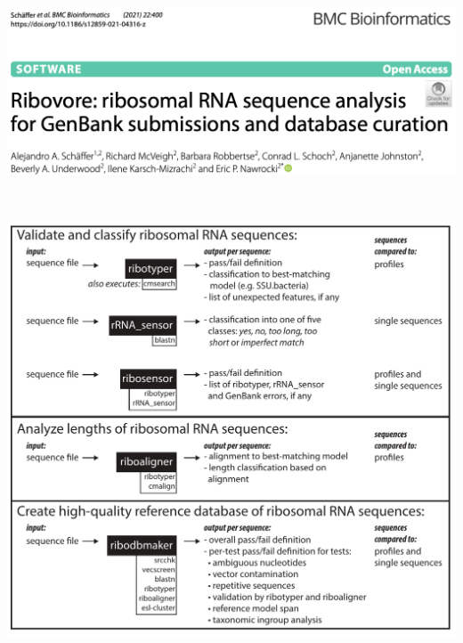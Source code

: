 \documentclass[landscape]{slides}
\begin{document}
%
\begin{slide}
\begin{center}
\includegraphics[width=6in]{figs/ribovore-paper-title}

\includegraphics[height=5.5in]{figs/ribovore}
\end{center}

\vfill
\end{slide}
\end{document}
